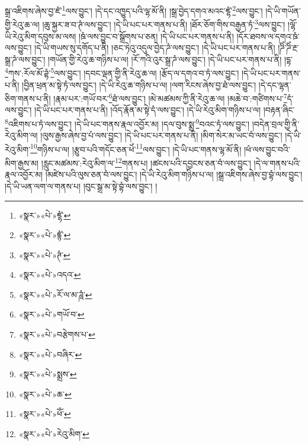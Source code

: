 སྒྲ་འཇིགས་ཞེས་བྱ་ཛཾ་\footnote{«སྣར་»«པེ་»ཛྷཾ་}ལས་བྱུང་། །དེ་དང་འཁྱུད་པའི་ལྷ་མོ་ནི། །སྒྲ་བྱེད་དགའ་མའང་ཛྷཾ་\footnote{«སྣར་»«པེ་»ཛྙཾ་}ལས་བྱུང་། །དེ་ཡི་གཡོན་གྱི་རེའུ་ཆ་ལ། །ཆུ་སྐྱར་ཟ་བ་ཊཾ་ལས་བྱུང་། །དེ་ཡི་པང་པར་གནས་པ་ནི། །ཐོར་ཅོག་གིས་བརྒྱན་ཏཾ་\footnote{«སྣར་»«པེ་»ཊཾ་}ལས་བྱུང་། །ལྷོ་ཡི་རེའུ་མིག་དབུས་མ་ལས། །ཋཾ་ལས་བྱུང་བ་སྒྲོགས་པ་ཅན། །དེ་ཡི་པང་པར་གནས་པ་ནི། །དོར་ཐབས་ལ་དགའ་ཋཾ་ལས་བྱུང་། །དེ་ཡི་གཡས་སུ་དགོད་པ་ནི། །ཅང་ཏེའུ་འདུལ་བྱེད་ཌཾ་ལས་བྱུང་། །དེ་ཡི་པང་པར་གནས་པ་ནི། །ཌིཾ་ཌིཾ་རྔ་སྒྲ་ཌཾ་ལས་བྱུང་། །གཡོན་གྱི་རེའུ་ཆ་གཉིས་པ་ལ། །རོ་ཀའི་འུར་སྒྲ་ཌཾ་ལས་བྱུང་། །དེ་ཡི་པང་པར་གནས་པ་ནི། །དྷ་\footnote{«སྣར་»«པེ་»འདའ་}ཀས་:རོལ་མོ་ཌྷཾ་\footnote{«སྣར་»«པེ་»རོ་ལ་མ་ཌཱཾ་}ལས་བྱུང་། །དབང་ལྡན་གྱི་ནི་རེའུ་ཆ་ལ། །རྩོད་ལ་དགའ་བ་ཏཾ་ལས་བྱུང་། །དེ་ཡི་པང་པར་གནས་པ་ནི། །བྱིན་ཕྲན་མ་སྟེ་ཏཾ་ལས་བྱུང་། །དེ་ཡི་རེའུ་ཆ་གཉིས་པ་ལ། །ལག་རིངས་ཞེས་བྱ་ཐཾ་ལས་བྱུང་། །དེ་དང་ལྷན་ཅིག་གནས་པ་ནི། །རྣམ་པར་:གཡོ་བར་\footnote{«སྣར་»«པེ་»གཡོ་བ་}ཐཾ་ལས་བྱུང་། །མེ་མཚམས་ཀྱི་ནི་རེའུ་ཆ་ལ། །མཆེ་བ་:གཙིགས་པ་\footnote{«སྣར་»«པེ་»བརྩེགས་པ་}དཾ་ལས་བྱུང་། །དེ་ཡི་པང་པར་གནས་པ་ནི། །འོད་རྣོན་མ་སྟེ་དཾ་ལས་བྱུང་། །དེ་ཡི་རེའུ་མིག་གཉིས་པ་ལ། །བརྟན་ཞིང་\footnote{«སྣར་»«པེ་»བཞིར་}འཇིགས་པ་ཏཾ་ལས་བྱུང་། །དེ་ཡི་པང་གནས་རྣལ་འབྱོར་མ། །དལ་བུས་སྨྲ་\footnote{«སྣར་»«པེ་»སྨྲས་}བའང་ཏཾ་ལས་བྱུང་། །བདེན་བྲལ་གྱི་ནི་རེའུ་མིག་ལ། །ལུས་རྒྱས་ཞེས་བྱ་པཾ་ལས་བྱུང་། །དེ་ཡི་པང་པར་གནས་པ་ནི། །མིག་སེར་མ་ཡང་བཾ་ལས་བྱུང་། །དེ་ཡི་རེའུ་མིག་\footnote{«སྣར་»«པེ་»ཆ་}གཉིས་པ་ལ། །རྩུབ་པའི་གདོང་ཅན་ཕེཾ་\footnote{«སྣར་»«པེ་»ཕོཾ་}ལས་བྱུང་། །དེ་ཡི་པང་གནས་ལྷ་མོ་ནི། །ཕཾ་ལས་བྱུང་བའི་མིག་རྒྱས་མ། །རླུང་མཚམས་:རེའུ་མིག་ལ་\footnote{«སྣར་»«པེ་»རེའུ་མིག་}གནས་པ། །ཚངས་པའི་དབྱངས་ཅན་བཾ་ལས་བྱུང་། །དེ་ལ་གནས་པའི་རྣལ་འབྱོར་མ། །མཛེས་པའི་ལུས་ཅན་བཾ་ལས་བྱུང་། །དེ་ཡི་རེའུ་མིག་གཉིས་པ་ལ། །སྒྲ་འཇིགས་ཞེས་བྱ་བྷཾ་ལས་བྱུང་། །དེ་ཡི་ཡན་ལག་ལ་གནས་པ། །བུང་སྒྲ་མ་སྟེ་བྷཾ་ལས་བྱུང་། །
